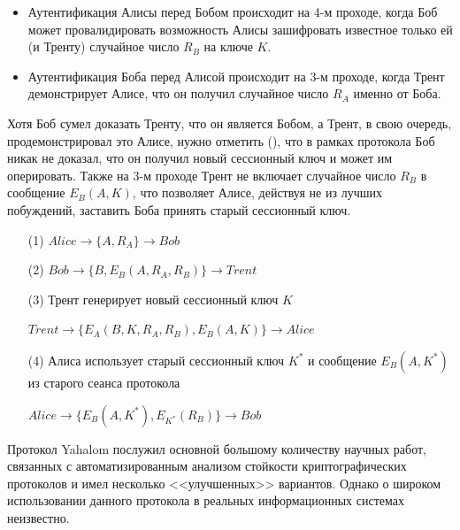 \begin{itemize}
    \item Аутентификация Алисы перед Бобом происходит на 4-м проходе, когда Боб может провалидировать возможность Алисы зашифровать известное только ей (и Тренту) случайное число $R_B$ на ключе $K$.
    \item Аутентификация Боба перед Алисой происходит на 3-м проходе, когда Трент демонстрирует Алисе, что он получил случайное число $R_A$ именно от Боба.
\end{itemize}

Хотя Боб сумел доказать Тренту, что он является Бобом, а Трент, в свою очередь, продемонстрировал это Алисе, нужно отметить (\cite{Zhou:Yu:Pan:Wang:2016}), что в рамках протокола Боб никак не доказал, что он получил новый сессионный ключ и может им оперировать. Также на 3-м проходе Трент не включает случайное число $R_B$ в сообщение $E_B(A, K)$, что позволяет Алисе, действуя не из лучших побуждений, заставить Боба принять старый сессионный ключ.

\begin{samepage}\begin{itemize}
	\item[(1)] $Alice \to \{ A, R_A \} \to Bob$
	\item[(2)] $Bob \to \{ B, E_B( A, R_A, R_B ) \} \to Trent$
	\item[(3)] Трент генерирует новый сессионный ключ $K$
	\item[{}] $Trent \to \{ E_A( B, K, R_A, R_B ), E_B(A, K) \} \to Alice$
	\item[(4)] Алиса использует старый сессионный ключ $K^*$ и сообщение $E_B( A, K^* )$ из старого сеанса протокола
	\item[{}] $Alice \to \{ E_B( A, K^* ), E_{K^*}( R_B ) \} \to Bob$
\end{itemize}\end{samepage}

Протокол Yahalom послужил основной большому количеству научных работ, связанных с автоматизированным анализом стойкости криптографических протоколов и имел несколько <<улучшенных>> вариантов. Однако о широком использовании данного протокола в реальных информационных системах неизвестно.

